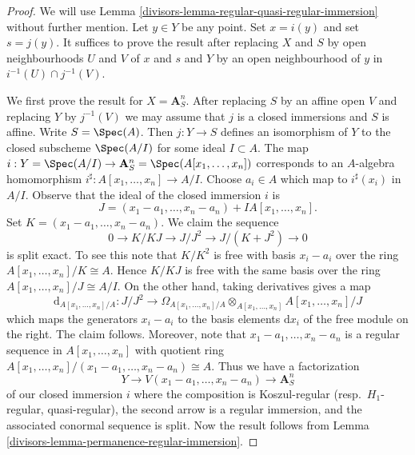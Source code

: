 \begin{proof}

We will use Lemma \ref{divisors-lemma-regular-quasi-regular-immersion}
without further mention.
Let $y \in Y$ be any point. Set $x = i(y)$ and set $s = j(y)$.
It suffices to prove the result after replacing $X$ and $S$ by open
neighbourhoods $U$ and $V$ of $x$ and $s$ and $Y$ by an open neighbourhood
of $y$ in $i^{-1}(U) \cap j^{-1}(V)$.

\medskip\noindent
We first prove the result for $X = \mathbf{A}^n_S$. After replacing $S$
by an affine open $V$ and replacing $Y$ by $j^{-1}(V)$ we may assume that
$j$ is a closed immersions and $S$ is affine. Write $S = \Spec(A)$.
Then $j : Y \to S$ defines an isomorphism of $Y$ to the closed subscheme
$\Spec(A/I)$ for some ideal $I \subset A$. The map
$i : Y = \Spec(A/I) \to
\mathbf{A}^n_S = \Spec(A[x_1, \ldots, x_n])$
corresponds to an $A$-algebra homomorphism
$i^\sharp : A[x_1, \ldots, x_n] \to A/I$.
Choose $a_i \in A$ which map to $i^\sharp(x_i)$ in $A/I$.
Observe that the ideal of the closed immersion $i$ is
$$
J = (x_1 - a_1, \ldots, x_n - a_n) + IA[x_1, \ldots, x_n].
$$
Set $K = (x_1 - a_1, \ldots, x_n - a_n)$. We claim the sequence
$$
0 \to K/KJ \to J/J^2 \to J/(K + J^2) \to 0
$$
is split exact. To see this note that $K/K^2$ is free with basis
$x_i - a_i$ over the ring $A[x_1, \ldots, x_n]/K \cong A$.
Hence $K/KJ$ is free with the same basis over the ring
$A[x_1, \ldots, x_n]/J \cong A/I$. On the other hand, taking derivatives
gives a map
$$
\text{d}_{A[x_1, \ldots, x_n]/A} :
J/J^2
\longrightarrow
\Omega_{A[x_1, \ldots, x_n]/A} \otimes_{A[x_1, \ldots, x_n]}
A[x_1, \ldots, x_n]/J
$$
which maps the generators $x_i - a_i$ to the basis elements $\text{d}x_i$
of the free module on the right. The claim follows. Moreover, note that
$x_1 - a_1, \ldots, x_n - a_n$ is a regular sequence in
$A[x_1, \ldots, x_n]$ with quotient ring
$A[x_1, \ldots, x_n]/(x_1 - a_1, \ldots, x_n - a_n) \cong A$.
Thus we have a factorization
$$
Y \to V(x_1 - a_1, \ldots, x_n - a_n) \to \mathbf{A}^n_S
$$
of our closed immersion $i$ where the composition is
Koszul-regular (resp.\ $H_1$-regular, quasi-regular),
the second arrow is a regular immersion, and the associated conormal
sequence is split. Now the result follows from
Lemma \ref{divisors-lemma-permanence-regular-immersion}.


\end{proof}
